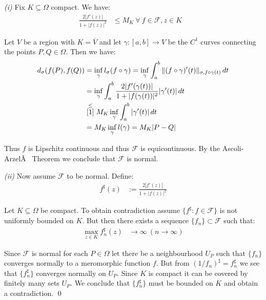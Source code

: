 \documentclass[12pt]{article}
\begin{document}
\emph{(i)} Fix $K \subseteq \Omega$ compact. We have:
\begin{align}
\frac{2 |f'(z)|}{1 + |f(z)|^2} &\leq M_K \ \forall \ f \in \mathcal{F}, z \in K & \tag{$*$} \label{1}
\end{align}

Let $V$ be a region with $K = \overline{V}$ and let $\gamma \colon [a,b] \to V$ be the $C^1$ curves connecting the points $P, Q \in \Omega$. Then we have:
\begin{align*}
d_{\sigma}(f(P), f(Q)) &= \inf_{\gamma} l_{\sigma}(f \circ \gamma) = \inf_{\gamma} \int_{a}^{b} \|(f \circ \gamma)'(t)\|_{\sigma, f \circ \gamma(t)} \,dt \\
&= \inf_{\gamma} \int_{a}^{b} \frac{2 |f'(\gamma(t))|}{1 + |f(\gamma(t))|^2} |\gamma'(t)| \,dt \\
&\stackrel{\leq}{\substack{\eqref{1}}} M_K \inf_{\gamma} \int_{a}^{b} |\gamma'(t)| \,dt \\
&= M_K \inf_{\gamma} l(\gamma) = M_K |P - Q|
\end{align*}

Thus $f$ is Lipschitz continuous and thus $\mathcal{F}$ is equicontinuous. By the Ascoli-ArzelÃ  Theorem we conclude that $\mathcal{F}$ is normal.

\emph{(ii)} Now assume $\mathcal{F}$ to be normal. Define:
\begin{align*}
f^{\sharp}(z) &:= \frac{2 |f'(z)|}{1 + |f(z)|^2} 
\end{align*}

Let $K \subseteq \Omega$ be compact. To obtain contradiction assume $\{f^{\sharp} : f \in \mathcal{F}\}$ is not uniformly bounded on $K$.
But then there exists a sequence $\{f_n\} \subset \mathcal{F}$ such that:
\begin{align*}
\max_{z \in K} f_n^{\sharp}(z) &\to \infty \ (n \to \infty)
\end{align*}

Since $\mathcal{F}$ is normal for each $P \in \Omega$ let there be a neighbourhood $U_P$ such that $\{f_n\}$ converges normally to a meromorphic function $f$. But from $(1 / f_n)^{\sharp} = f_n^{\sharp}$ we see that $\{f_n^{\sharp}\}$ converges normally on $U_P$. Since $K$ is compact it can be covered by finitely many sets $U_P$. We conclude that $\{f_n^{\sharp}\}$ must be bounded on $K$ and obtain a contradiction. \qed
\end{document}
